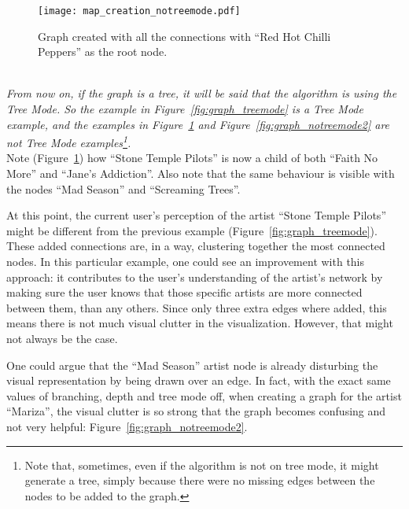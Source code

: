       \begin{figure}[ht]
        \begin{center}
          \texttt{[image: map\_creation\_notreemode.pdf]}
        \end{center}
        \caption{Graph created with all the connections with ``Red Hot Chilli Peppers'' as the root node.}
        \label{fig:graph_notreemode}
      \end{figure}

      \hfill \\
      \indent \emph{
      From now on, if the graph is a tree, it will be said that the algorithm is using the \emph{Tree Mode}.
      So the example in Figure~\ref{fig:graph_treemode} is a \emph{Tree Mode} example, and the examples in Figure~\ref{fig:graph_notreemode} and Figure~\ref{fig:graph_notreemode2} are not \emph{Tree Mode} examples\footnote{
        Note that, sometimes, even if the algorithm is not on tree mode, it might generate a tree, simply because there were no missing edges between the nodes to be added to the graph.
      }.}
      \hfill \\

      Note (Figure~\ref{fig:graph_notreemode}) how ``Stone Temple Pilots'' is now a child of both ``Faith No More'' and ``Jane's Addiction''.
      Also note that the same behaviour is visible with the nodes ``Mad Season'' and ``Screaming Trees''.

      At this point, the current user's perception of the artist ``Stone Temple Pilots'' might be different from the previous example (Figure~\ref{fig:graph_treemode}).
      These added connections are, in a way, clustering together the most connected nodes.
      In this particular example, one could see an improvement with this approach: it contributes to the user's understanding of the artist's network by making sure the user knows that those specific artists are more connected between them, than any others.
      Since only three extra edges where added, this means there is not much visual clutter in the visualization.
      However, that might not always be the case.

      One could argue that the ``Mad Season'' artist node is already disturbing the visual representation by being drawn over an edge.
      In fact, with the exact same values of branching, depth and tree mode off, when creating a graph for the artist ``Mariza'', the visual clutter is so strong that the graph becomes confusing and not very helpful: Figure~\ref{fig:graph_notreemode2}.

